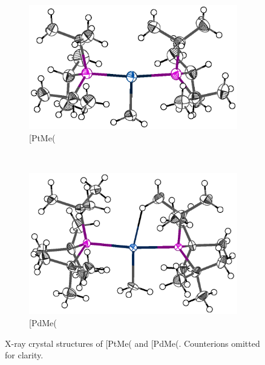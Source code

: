 \begin{figure}[htbp]
        \centering
        \begin{subfigure}[b]{0.45\textwidth}
                \includegraphics[width=\textwidth]{../Othercrystals/PtMe/245432.eps}
                \caption{[PtMe(\ce{P^{i}Pr3)2{]}+}}
                \label{Pt(iPr)ingleson}
        \end{subfigure}%
        ~ 
        \begin{subfigure}[b]{0.5\textwidth}
                \includegraphics[width=\textwidth]{../Othercrystals/PtMe/915278.eps}
                \caption{[PdMe(\ce{P^{t}Bu3)2{]}+}}
                \label{Pt(tBu)Walter}
        \end{subfigure}
        \caption[X-ray crystal structures of [PtMe(\ce{P^{i}Pr3)2{]}+} and [PdMe(\ce{P^{t}Bu3)2{]}+}]{X-ray crystal structures of [PtMe(\ce{P^{i}Pr3)2{]}+}\cite{Ingleson2004} and [PdMe(\ce{P^{t}Bu3)2{]}+}\cite{Walter2013}.  Counterions omitted for clarity.}
        \label{crystal:PtMe}
\end{figure}

